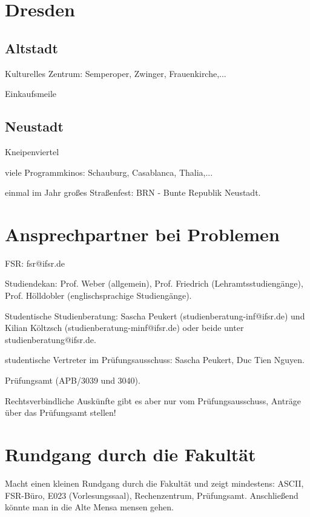 \documentclass[a4paper,12pt]{report}
\begin{document}
\section{Dresden}

\subsection{Altstadt}
\begin{itemize*}
	\item Kulturelles Zentrum: Semperoper, Zwinger, Frauenkirche,...
	\item Einkaufsmeile
\end{itemize*}

\subsection{Neustadt}
\begin{itemize*}
	\item Kneipenviertel
	\item viele Programmkinos: Schauburg, Casablanca, Thalia,...
	\item einmal im Jahr großes Straßenfest: BRN - Bunte Republik Neustadt.
\end{itemize*}

\section{Ansprechpartner bei Problemen}
\begin{itemize*}
	\item FSR: fsr@ifsr.de
	\item Studiendekan: Prof. Weber (allgemein), Prof. Friedrich (Lehramtsstudiengänge), Prof. Hölldobler (englischsprachige Studiengänge).
	\item Studentische Studienberatung: Sascha Peukert (studienberatung-inf@ifsr.de) und Kilian Költzsch (studienberatung-minf@ifsr.de) oder beide unter studienberatung@ifsr.de.
	\item studentische Vertreter im Prüfungsausschuss: Sascha Peukert, Duc Tien Nguyen.
	\item Prüfungsamt (APB/3039 und 3040).
	\item Rechtsverbindliche Auskünfte gibt es aber nur vom Prüfungsausschuss, Anträge über das Prüfungsamt stellen!
\end{itemize*}

\section{Rundgang durch die Fakultät}
Macht einen kleinen Rundgang durch die Fakultät und zeigt mindestens: ASCII, FSR-Büro, E023 (Vorlesungssaal), Rechenzentrum, Prüfungsamt.
Anschließend könnte man in die Alte Mensa mensen gehen.
\end{document}
